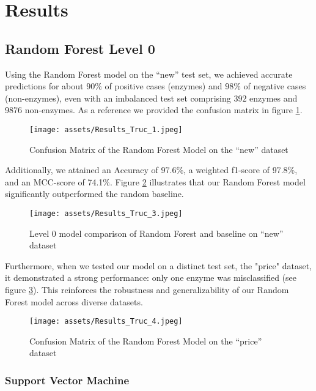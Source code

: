 \documentclass{bioinfo}
\begin{document}
\section{Results}	

\subsection{Random Forest Level 0}\label{sec:RF_level0}
Using the Random Forest model on the “new” test set, we achieved accurate predictions for about 
$90\%$ of positive cases (enzymes) and $98\%$ of negative cases (non-enzymes), even with an imbalanced test set comprising 
$392$ enzymes and 9876 non-enzymes. As a reference we provided the confusion matrix in figure \ref{fig:RF_conf_l0}.

\begin{figure}[!htpb]
\texttt{[image: assets/Results\_Truc\_1.jpeg]}
\caption{Confusion Matrix of the Random Forest Model on the “new” dataset}\label{fig:RF_conf_l0}
\end{figure}

Additionally, we attained an Accuracy of 97.6\%, a weighted f1-score of 97.8\%, and an MCC-score of 74.1\%. 
Figure \ref{fig:RF_scores_l0} illustrates that our Random Forest model significantly outperformed the random baseline.

\begin{figure}[!htpb]
\texttt{[image: assets/Results\_Truc\_3.jpeg]}
\caption{Level 0 model comparison of Random Forest and baseline on “new” dataset}\label{fig:RF_scores_l0}
\end{figure}

Furthermore, when we tested our model on a distinct test set, the "price" dataset,
it demonstrated a strong performance: only one enzyme was misclassified  (see figure \ref{fig:RF_conf_l0_price}).
This reinforces the robustness and generalizability of our Random Forest model across diverse datasets.

\begin{figure}[!htpb]
\texttt{[image: assets/Results\_Truc\_4.jpeg]}
\caption{Confusion Matrix of the Random Forest Model on the “price” dataset}\label{fig:RF_conf_l0_price}
\end{figure}


\subsubsection{Support Vector Machine}
\end{document}
